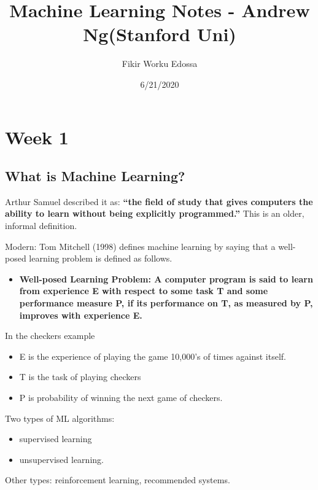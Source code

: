 \documentclass[
]{article}
\title{Machine Learning Notes - Andrew Ng(Stanford Uni)}
\author{Fikir Worku Edossa}
\date{6/21/2020}
\providecommand{\tightlist}{%
  \setlength{\itemsep}{0pt}\setlength{\parskip}{0pt}}
\begin{document}
\maketitle

{
\setcounter{tocdepth}{2}
\tableofcontents
}
\hypertarget{week-1}{%
\section{Week 1}\label{week-1}}

\hypertarget{what-is-machine-learning}{%
\subsection{What is Machine Learning?}\label{what-is-machine-learning}}

Arthur Samuel described it as: \textbf{``the field of study that gives
computers the ability to learn without being explicitly programmed.''}
This is an older, informal definition.

Modern: Tom Mitchell (1998) defines machine learning by saying that a
well-posed learning problem is defined as follows.

\begin{itemize}
\tightlist
\item
  \textbf{Well-posed Learning Problem: A computer program is said to
  learn from experience E with respect to some task T and some
  performance measure P, if its performance on T, as measured by P,
  improves with experience E.}
\end{itemize}

In the checkers example

\begin{itemize}
\tightlist
\item
  E is the experience of playing the game 10,000's of times against
  itself.
\item
  T is the task of playing checkers
\item
  P is probability of winning the next game of checkers.
\end{itemize}

Two types of ML algorithms:

\begin{itemize}
\tightlist
\item
  supervised learning
\item
  unsupervised learning.
\end{itemize}

Other types: reinforcement learning, recommended systems.
\end{document}
